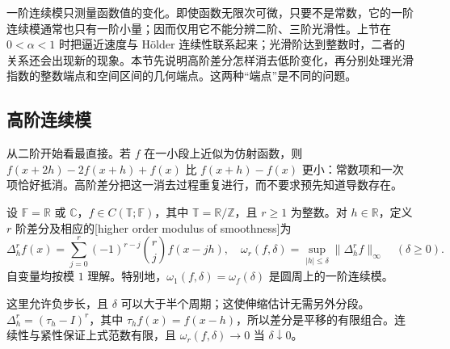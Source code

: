 
一阶连续模只测量函数值的变化。即使函数无限次可微，只要不是常数，它的一阶连续模通常也只有一阶小量；因而仅用它不能分辨二阶、三阶光滑性。上节在 \(0<\alpha<1\) 时把逼近速度与 Hölder 连续性联系起来；光滑阶达到整数时，二者的关系还会出现新的现象。本节先说明高阶差分怎样消去低阶变化，再分别处理光滑指数的整数端点和空间区间的几何端点。这两种“端点”是不同的问题。

\subsection{高阶连续模}
\label{b2:subsec:approximation-higher-moduli}

从二阶开始看最直接。若 \(f\) 在一小段上近似为仿射函数，则 \(f(x+2h)-2f(x+h)+f(x)\) 比 \(f(x+h)-f(x)\) 更小：常数项和一次项恰好抵消。高阶差分把这一消去过程重复进行，而不要求预先知道导数存在。

\begin{definition}\label{b2:def:approximation-higher-modulus}
设 \(\mathbb F=\mathbb R\) 或 \(\mathbb C\)，\(f\in C(\mathbb T;\mathbb F)\)，其中 \(\mathbb T=\mathbb R/\mathbb Z\)，且 \(r\geq1\) 为整数。对 \(h\in\mathbb R\)，定义 \(r\) 阶差分及相应的[higher order modulus of smoothness]为
\[
 \Delta_h^r f(x)=\sum_{j=0}^r(-1)^{r-j}\binom rj f(x-jh),
 \quad
 \omega_r(f,\delta)=\sup_{|h|\leq\delta}\|\Delta_h^r f\|_\infty
 \quad(\delta\geq0).
\]
自变量均按模 \(1\) 理解。特别地，\(\omega_1(f,\delta)=\omega_f(\delta)\) 是圆周上的一阶连续模。
\end{definition}

这里允许负步长，且 \(\delta\) 可以大于半个周期；这使伸缩估计无需另外分段。\(\Delta_h^r=(\tau_h-I)^r\)，其中 \(\tau_hf(x)=f(x-h)\)，所以差分是平移的有限组合。连续性与紧性保证上式范数有限，且 \(\omega_r(f,\delta)\to0\) 当 \(\delta\downarrow0\)。


